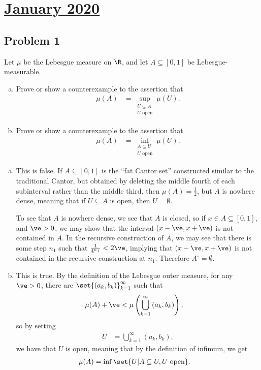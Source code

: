 \documentclass[10pt]{mypackage}
\begin{document}
\section{\href{https://math.virginia.edu/graduate/exams/analysis/2020Jan_real.pdf}{January 2020}}%
\subsection{Problem 1}%
\begin{problem}
  Let $\mu$ be the Lebesgue measure on $\R$, and let $A\subseteq [0,1]$ be Lebesgue-measurable.
  \begin{enumerate}[(a)]
    \item Prove or show a counterexample to the assertion that
      \begin{align*}
        \mu(A) &= \sup_{\substack{U\subseteq A\\U\text{ open}}} \mu\left( U \right).
      \end{align*}
    \item Prove or show a counterexample to the assertion that
      \begin{align*}
        \mu(A) &= \inf_{\substack{A\subseteq U\\U\text{ open}}} \mu\left( U \right).
      \end{align*}
  \end{enumerate}
\end{problem}
\begin{enumerate}[(a)]
  \item This is false. If $A\subseteq [0,1]$ is the ``fat Cantor set'' constructed similar to the traditional Cantor, but obtained by deleting the middle fourth of each subinterval rather than the middle third, then $\mu(A) = \frac{1}{2}$, but $A$ is nowhere dense, meaning that if $U\subseteq A$ is open, then $U = \emptyset$.\newline

    To see that $A$ is nowhere dense, we see that $A$ is closed, so if $x\in A\subseteq [0,1]$, and $\ve > 0$, we may show that the interval $\left( x-\ve,x+\ve \right)$ is not contained in $A$. In the recursive construction of $A$, we may see that there is some step $n_1$ such that $\frac{1}{4^{n_1}} < 2\ve$, implying that $\left( x-\ve,x+\ve \right)$ is not contained in the recursive construction at $n_1$. Therefore $A^{\circ} = \emptyset$.
  \item This is true. By the definition of the Lebesgue outer measure, for any $\ve > 0$, there are $\set{\left( a_k,b_k \right)}_{k=1}^{\infty}$ such that
    \begin{align*}
      \mu(A) + \ve &< \mu\left( \bigcup_{k=1}^{\infty}\left( a_k,b_k \right) \right),
    \end{align*}
    so by setting
    \begin{align*}
      U &= \bigcup_{k=1}^{\infty}\left( a_k,b_k \right),
    \end{align*}
    we have that $U$ is open, meaning that by the definition of infimum, we get 
    \begin{align*}
      \mu(A) &= \inf\set{U | A\subseteq U,U\text{ open}}.
    \end{align*}
\end{enumerate}
\end{document}

